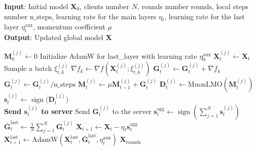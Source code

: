 \documentclass[letterpaper]{article} %
\begin{document}
\begin{algorithm}[!t]
\caption{Federated SignMuon}
\label{fed_alg}
\textbf{Input}: Initial model $\mathbf{X}_0$, clients number $N$, rounds number $\mathrm{rounds}$, local steps number $\mathrm{n\_steps}$, learning rate for the main layers $\eta_t$, learning rate for the last layer $\eta_t^{\text{aux}}$, momentum coefficient $\mu$ \\
\textbf{Output}: Updated global model $\mathbf{X}$
\begin{algorithmic}[1]
 \State $\mathbf{M}_0^{(j)} \gets 0$ 
\EndFor
\State Initialize AdamW for last\_layer with learning rate $\eta^{\mathrm{aux}}_0$
        \State $\mathbf{X}_t^{(j)} \gets \mathbf{X}_t$ 
            \State Sample a batch $\xi_{t,k}^{(j)}$
            \State $\nabla f_k \gets \nabla f(\mathbf{X}_t^{(j)}; \xi_{t,k}^{(j)})$
            \State $\mathbf{G}_t^{(j)} \gets \mathbf{G}_t^{(j)} + \nabla f_k$
        \EndFor
        \\ \State $\mathbf{G}_t^{(j)} \gets \mathbf{G}_t^{(j)} / \mathrm{n\_steps}$ 
        \State $\mathbf{M}_t^{(j)} \gets \mu \mathbf{M}_{t-1}^{(j)} + \mathbf{G}_t^{(j)}$
        \State $\mathbf{D}_t^{(j)} \gets \mathrm{MuonLMO}(\mathbf{M}_t^{(j)})$
        \State $\mathbf{s}_t^{(j)} \gets \operatorname{sign}\bigl(\mathbf{D}_t^{(j)}\bigr)$ 
        \\\State \textbf{Send $\mathbf{s}_t^{(j)}$ to server} 
          \State Send $\mathbf{G}_t^{(j)}$ to the server
        \EndFor
      \EndFor
      \State $\mathbf{s}_t^{\mathrm{agg}} \gets \operatorname{sign}\!\left(\sum_{j=1}^{N} \mathbf{s}_t^{(j)}\right)$ 
      \State $\bar{\mathbf{G}}_t^{\text{last}} \gets \frac{1}{N}\sum_{j=1}^{N} \mathbf{G}_t^{(j)}$
      \State $\mathbf{X}_{t+1} \gets \mathbf{X}_t - \eta_t \mathbf{s}_t^{\mathrm{agg}}$ 
      \\ \State $\mathbf{X}_{t+1}^{\text{last}} \gets \text{AdamW}(\mathbf{X}_t^{\text{last}}, \bar{\mathbf{G}}_t^{\text{last}}, \eta_t^{\text{aux}})$
\EndFor
\State \Return $\mathbf{X}_{\mathrm{rounds}}$
\end{algorithmic}
\end{algorithm}
\end{document}
